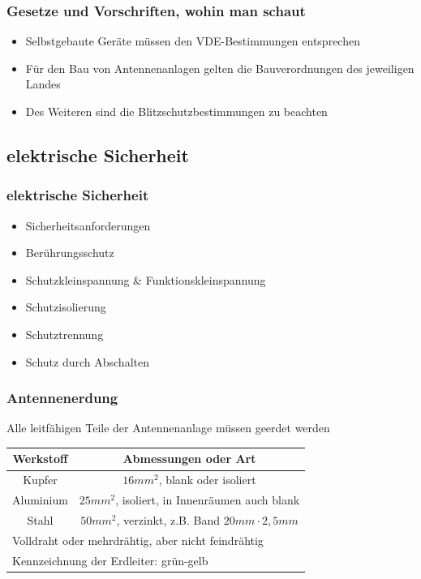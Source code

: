 \begin{frame}
	\frametitle{Gesetze und Vorschriften, wohin man schaut}
	\begin{itemize}
		\item Selbstgebaute Geräte müssen den VDE-Bestimmungen entsprechen
		\item Für den Bau von Antennenanlagen gelten die Bauverordnungen des jeweiligen Landes
		\item Des Weiteren sind die Blitzschutzbestimmungen zu beachten
	\end{itemize}
\end{frame}

\subsection{elektrische Sicherheit}

\begin{frame}
	\frametitle{elektrische Sicherheit}
	\begin{itemize}
		\item	Sicherheitsanforderungen
		\item	Berührungsschutz
		\item	Schutzkleinspannung \& Funktionskleinspannung
		\item	Schutzisolierung
		\item	Schutztrennung
		\item	Schutz durch Abschalten
	\end{itemize}
\end{frame}

\begin{frame}
	\frametitle{Antennenerdung}
	Alle leitfähigen Teile der Antennenanlage müssen geerdet werden\\[1.5em]
	\begin{tabular}{|c|c|}
		\hline
		\textbf{Werkstoff} & \textbf{Abmessungen oder Art} \\ \hline
		Kupfer & $16 mm^2$, blank oder isoliert \\ \hline
		Aluminium & $25 mm^2$, isoliert, in Innenräumen auch blank \\ \hline
		Stahl & $50 mm^2$, verzinkt, z.B. Band $20mm \cdot 2,5mm$ \\ \hline
		\multicolumn{2}{|l|}{Volldraht oder mehrdrähtig, aber nicht feindrähtig} \\
		\multicolumn{2}{|l|}{Kennzeichnung der Erdleiter: grün-gelb} \\ \hline 	
	\end{tabular}
\end{frame}

